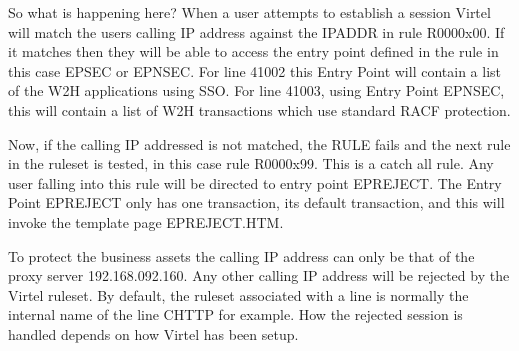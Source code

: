 \documentclass[letterpaper,10pt,english]{sphinxmanual}
\begin{document}
\begin{sphinxVerbatim}[commandchars=\\\{\}]
 
 
                                      
\end{sphinxVerbatim}

\sphinxAtStartPar
So what is happening here? When a user attempts to establish a session Virtel will match the users calling IP address against the IPADDR in rule R0000x00. If it matches then they will be able to access the entry point defined in the rule \textendash{} in this case EPSEC or EPNSEC. For line 41002 this Entry Point will contain a list of the W2H applications using SSO.
For line 41003, using Entry Point EPNSEC, this will contain a list of W2H transactions which use standard RACF protection.

\sphinxAtStartPar
Now, if the calling IP addressed is not matched, the RULE fails and the next rule in the ruleset is tested, in this case rule R0000x99. This is a catch all rule. Any user falling into this rule will be directed to entry point EPREJECT. The Entry Point EPREJECT only has one transaction, its default transaction, and this will invoke the template page
EPREJECT.HTM.

\sphinxAtStartPar
To protect the business assets the calling IP address can only be that of the proxy server \sphinxhyphen{} 192.168.092.160. Any other calling IP address will be rejected by the Virtel ruleset. By default, the ruleset associated with a line is normally the internal name of the line \textendash{} C\sphinxhyphen{}HTTP for example. How the rejected session is handled depends on how Virtel has been setup.
\end{document}
